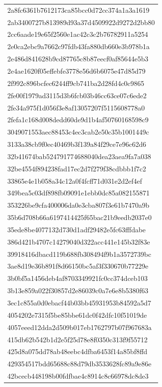 \begin{tabular}{l}
2a8fc6361b7612173ca85bcc0d72cc374a1a3a1619 \\
2ab3400727b813989d93a37d4509922d9272d2bb80 \\
2cc6aade19e65f2560e1ac42c3c2b76782911a5254 \\
2e0ca2ebc9a7662c97fdb43fa880db660e3b978b1a \\
2e486d841628b9cd87765c8b87eecf0af85644e5b3 \\
2e4ae1620f05effebfe3778e56d6b6075e47d85d79 \\
2f992c896bcfec6244ff9cb741ba2d28fd4c0c9865 \\
2fe00f1979ad3115d3b6fcb03b46cc63ce07c6ede2 \\
2fe34a975f1d056f3e8af13057207f5115608778a0 \\
2fefa1c168d008dedd60de9d1b4af50760168598c9 \\
3049071553aec88453c4ec3cab2e50c35b1001449c \\
3133a38cb9f0ec40469b3f139a84f29ce7e96c62d6 \\
32b41674bab524791774688040dea23aea9fa7a038 \\
32be4554f894238fad17ec2d7f279f38cdbbb1f7c2 \\
33865e4e1b058a34c12a0f4fcff71d031e2d2ef4ef \\
349bea5c03df898fb09091e1ebb0dc85a082155871 \\
353226be9cfa400006da0e3cba807f3e61b7470a9b \\
35b6d708b66a6197414425f65bac21b9eedb2037e0 \\
35ede8be4077132d730d1adf29482e5fc63fffdabe \\
386d421b4707c14279040d322acc441e145b32f83e \\
39918416dbacd119b688fb308494f9b1a3572739bc \\
3ae8d19e36b891f8d66150bc5af3f330670b77229e \\
3b0bf5a1456deb4af8703349921fc0cc374dceb103 \\
3b13e859a022f30857d2e86039c0a7e6e8b5380f63 \\
3ec1c855a0d0ebacf44b03bb45931953b84592a5d7 \\
4054202e7315f5be85bbe61dc0f42dfc10f51019de \\
4057eeed12dda2d509b017eb1762797b07f967683a \\
415db62b542b1d2e5f25d78e8f0350c313f9f55712 \\
425d8a075dd78ab48eebc4dfba6453f14a85bf8ffd \\
429354517bdd65688c88d79db3533628fc89a9e86e \\
42bcecb448198b00fdfbae4c8914c8c66978dc8de3 \\

\end{tabular}
